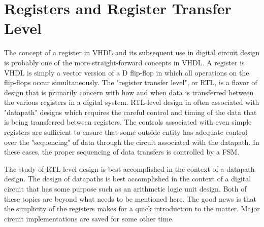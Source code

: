 %
%
%
\chapter{Registers and Register Transfer Level}
The concept of a register in VHDL and its subsequent use in digital circuit design is probably one of the more straight-forward concepts in VHDL. A register is VHDL is simply a vector version of a D flip-flop in which all operations on the flip-flops occur simultaneously. The "register transfer level", or RTL, is a flavor of design that is primarily concern with how and when data is transferred between the various registers in a digital system. RTL-level design in often associated with "datapath" designs which requires the careful control and timing of the data that is being transferred between registers. The controls associated with even simple registers are sufficient to ensure that some outside entity has adequate control over the "sequencing" of data through the circuit associated with the datapath. In these cases, the proper sequencing of data transfers is controlled by a FSM. 

The study of RTL-level design is best accomplished in the context of a datapath design. The design of datapaths is best accomplished in the context of a digital circuit that has some purpose such as an arithmetic logic unit design. Both of these topics are beyond what needs to be mentioned here. The good news is that the simplicity of the registers makes for a quick introduction to the matter. Major circuit implementations are saved for some other time.

